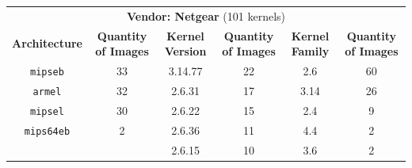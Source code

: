 \begin{table}[H]
{\begin{tabular}{cccccc}
\multicolumn{6}{c}{\textbf{Vendor: Netgear} (101 kernels)}                                                                        \\
\textbf{Architecture} & \multicolumn{1}{c|}{\textbf{Quantity of Images}} & \textbf{Kernel Version} & \multicolumn{1}{c|}{\textbf{Quantity of Images}} & \textbf{Kernel Family} & \textbf{Quantity of Images} \\ \hline
{\tt mipseb}              & \multicolumn{1}{c|}{33}               & 3.14.77                 & \multicolumn{1}{c|}{22}                          & 2.6                    & 60                          \\
{\tt armel}               & \multicolumn{1}{c|}{32}               & 2.6.31                  & \multicolumn{1}{c|}{17}                          & 3.14                   & 26                          \\
{\tt mipsel}              & \multicolumn{1}{c|}{30}               & 2.6.22                  & \multicolumn{1}{c|}{15}                          & 2.4                    & 9                           \\
{\tt mips64eb}            & \multicolumn{1}{c|}{2}                & 2.6.36                  & \multicolumn{1}{c|}{11}                          & 4.4                    & 2                           \\
                          & \multicolumn{1}{c|}{}                 & 2.6.15                  & \multicolumn{1}{c|}{10}                          & 3.6                    & 2                           \\ \hline


\end{tabular}}
\end{table}
